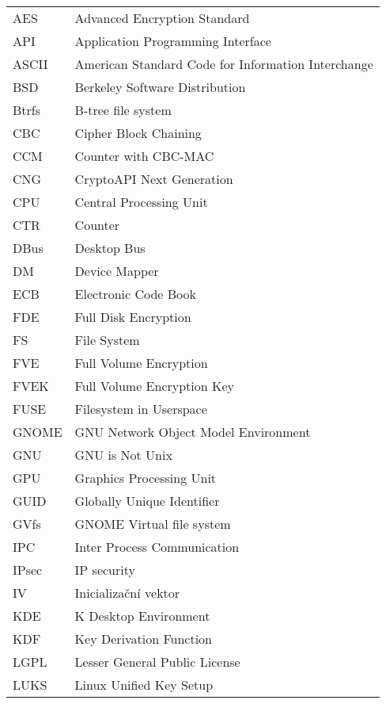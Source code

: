 
\seznamzkr

\setlength{\LTleft}{0pt}
\begin{longtable}{ll}
  AES & Advanced Encryption Standard \\
  API & Application Programming Interface \\
  ASCII & American Standard Code for Information Interchange \\
  BSD & Berkeley Software Distribution \\
  Btrfs & B-tree file system \\
  CBC & Cipher Block Chaining \\
  CCM & Counter with CBC-MAC \\
  CNG & CryptoAPI Next Generation \\
  CPU & Central Processing Unit \\
  CTR & Counter \\
  DBus & Desktop Bus \\
  DM & Device Mapper \\
  ECB & Electronic Code Book \\
  FDE & Full Disk Encryption \\
  FS &  File System \\
  FVE & Full Volume Encryption \\
  FVEK & Full Volume Encryption Key \\
  FUSE & Filesystem in Userspace \\
  GNOME & GNU Network Object Model Environment \\
  GNU & GNU is Not Unix \\
  GPU & Graphics Processing Unit \\
  GUID & Globally Unique Identifier \\
  GVfs & GNOME Virtual file system \\
  IPC & Inter Process Communication \\
  IPsec & IP security \\
  IV & Inicializační vektor \\
  KDE & K Desktop Environment \\
  KDF & Key Derivation Function \\
  LGPL & Lesser General Public License \\
  LUKS & Linux Unified Key Setup \\

\end{longtable}
